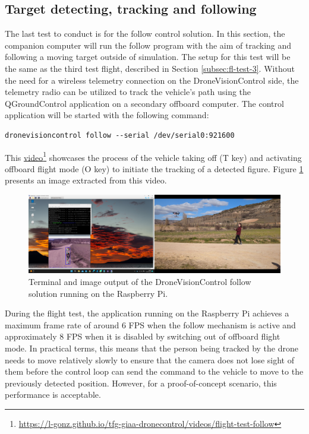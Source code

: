 \subsection{Target detecting, tracking and following}
\label{subsec:fl-test-5}

The last test to conduct is for the follow control solution. In this section, the companion computer will run the follow program with the aim of tracking and following a moving target outside of simulation. The setup for this test will be the same as the third test flight, described in Section \ref{subsec:fl-test-3}. Without the need for a wireless telemetry connection on the DroneVisionControl side, the telemetry radio can be utilized to track the vehicle's path using the QGroundControl application on a secondary offboard computer. The control application will be started with the following command:
\begin{verbatim}
dronevisioncontrol follow --serial /dev/serial0:921600
\end{verbatim}
This \href{https://l-gonz.github.io/tfg-giaa-dronecontrol/videos/flight-test-follow}{video}\footnote{\url{https://l-gonz.github.io/tfg-giaa-dronecontrol/videos/flight-test-follow}} showcases the process of the vehicle taking off (T key) and activating offboard flight mode (O key) to initiate the tracking of a detected figure. Figure \ref{fig:flight-test-follow} presents an image extracted from this video.


\begin{figure}[H]
  \centering
  \includegraphics[width=\textwidth, keepaspectratio]{img/video-field-test-follow.png}
  \caption{Terminal and image output of the DroneVisionControl follow solution running on the Raspberry Pi.}
  \label{fig:flight-test-follow}
\end{figure}


During the flight test, the application running on the Raspberry Pi achieves a maximum frame rate of around 6 FPS when the follow mechanism is active and approximately 8 FPS when it is disabled by switching out of offboard flight mode. In practical terms, this means that the person being tracked by the drone needs to move relatively slowly to ensure that the camera does not lose sight of them before the control loop can send the command to the vehicle to move to the previously detected position. However, for a proof-of-concept scenario, this performance is acceptable.


